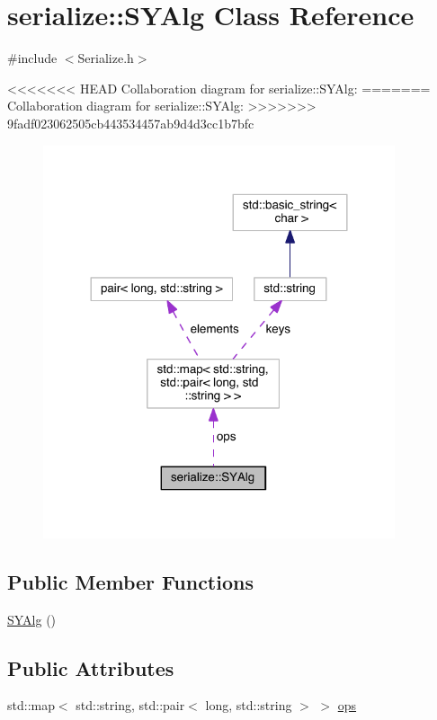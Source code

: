 \hypertarget{classserialize_1_1_s_y_alg}{}\section{serialize\+:\+:S\+Y\+Alg Class Reference}
\label{classserialize_1_1_s_y_alg}


{\ttfamily \#include $<$Serialize.\+h$>$}



<<<<<<< HEAD
Collaboration diagram for serialize\+:\+:S\+Y\+Alg\+:\nopagebreak
=======
Collaboration diagram for serialize\+:\+:S\+Y\+Alg\+:
\nopagebreak
>>>>>>> 9fadf023062505cb443534457ab9d4d3cc1b7bfc
\begin{figure}[H]
\begin{center}
\leavevmode
\includegraphics[width=293pt]{classserialize_1_1_s_y_alg__coll__graph}
\end{center}
\end{figure}
\subsection*{Public Member Functions}
\begin{DoxyCompactItemize}
\item 
\hyperlink{classserialize_1_1_s_y_alg_a0e57b976c122fc29293c26e3e4c3ae55}{S\+Y\+Alg} ()
\end{DoxyCompactItemize}
\subsection*{Public Attributes}
\begin{DoxyCompactItemize}
\item 
std\+::map$<$ std\+::string, std\+::pair$<$ long, std\+::string $>$ $>$ \hyperlink{classserialize_1_1_s_y_alg_a1e3689b2ee1e8e0f088407e854fca3ab}{ops}
\end{DoxyCompactItemize}


